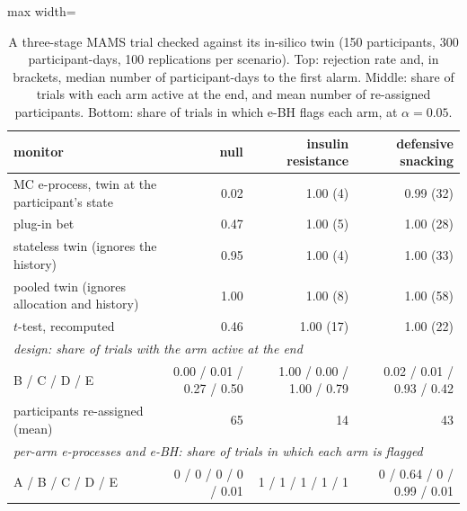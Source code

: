 \documentclass[11pt]{article}
\theoremstyle{remark}
\begin{document}
\begin{table}[t]
\centering
\caption{A three-stage MAMS trial checked against its in-silico twin (150
participants, 300 participant-days, 100 replications per scenario). Top:
rejection rate and, in brackets, median number of participant-days to the
first alarm. Middle: share of trials with each arm active at the end, and mean
number of re-assigned participants. Bottom: share of trials in which e-BH
flags each arm, at $\alpha = 0.05$.}
\label{tab:trial}
\begin{adjustbox}{max width=\textwidth}
\begin{tabular}{lrrr}
\toprule
monitor & null & insulin resistance & defensive snacking \\
\midrule
MC e-process, twin at the participant's state & 0.02 & 1.00 (4) & 0.99 (32) \\
plug-in bet & 0.47 & 1.00 (5) & 1.00 (28) \\
stateless twin (ignores the history) & 0.95 & 1.00 (4) & 1.00 (33) \\
pooled twin (ignores allocation and history) & 1.00 & 1.00 (8) & 1.00 (58) \\
$t$-test, recomputed & 0.46 & 1.00 (17) & 1.00 (22) \\
\midrule
\multicolumn{4}{l}{\emph{design: share of trials with the arm active at the end}} \\
B / C / D / E & 0.00 / 0.01 / 0.27 / 0.50 & 1.00 / 0.00 / 1.00 / 0.79 & 0.02 / 0.01 / 0.93 / 0.42 \\
participants re-assigned (mean) & 65 & 14 & 43 \\
\midrule
\multicolumn{4}{l}{\emph{per-arm e-processes and e-BH: share of trials in which each arm is flagged}} \\
A / B / C / D / E & 0 / 0 / 0 / 0 / 0.01 & 1 / 1 / 1 / 1 / 1 & 0 / 0.64 / 0 / 0.99 / 0.01 \\
\bottomrule
\end{tabular}
\end{adjustbox}
\end{table}
\end{document}
